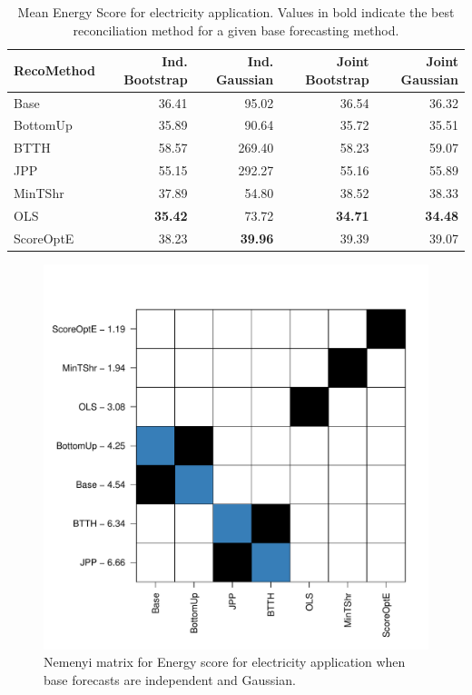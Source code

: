 \documentclass[12pt]{article}
\theoremstyle{definition}
\begin{document}
\begin{table}[H]
\footnotesize
\centering
\caption{\label{tab:appres} Mean Energy Score for electricity application.  Values in bold indicate the best reconciliation method for a given base forecasting method.}


\begin{tabular}{l|r|r|r|r}
	\hline
	RecoMethod & Ind. Bootstrap & Ind. Gaussian & Joint Bootstrap & Joint Gaussian\\
	\hline
	Base & 36.41 & 95.02 & 36.54 & 36.32\\
	\hline
	BottomUp & 35.89 & 90.64 & 35.72 & 35.51\\
	\hline
	BTTH & 58.57 & 269.40 & 58.23 & 59.07\\
	\hline
	JPP & 55.15 & 292.27 & 55.16 & 55.89\\
	\hline
	MinTShr & 37.89 & 54.80 & 38.52 & 38.33\\
	\hline
	OLS & \textbf{35.42} & 73.72 & \textbf{34.71} & \textbf{34.48}\\
	\hline
	ScoreOptE & 38.23 & \textbf{39.96} & 39.39 & 39.07\\
	\hline
\end{tabular}

\end{table}

\begin{figure}
	\centering
	\includegraphics[width=.4\textheight]{Figs/nemenyi_ig.pdf}
	\caption{Nemenyi matrix for Energy score for electricity application when base forecasts are independent and Gaussian.}
		\label{fig:nem_app_ig}
\end{figure}	
\end{document}
